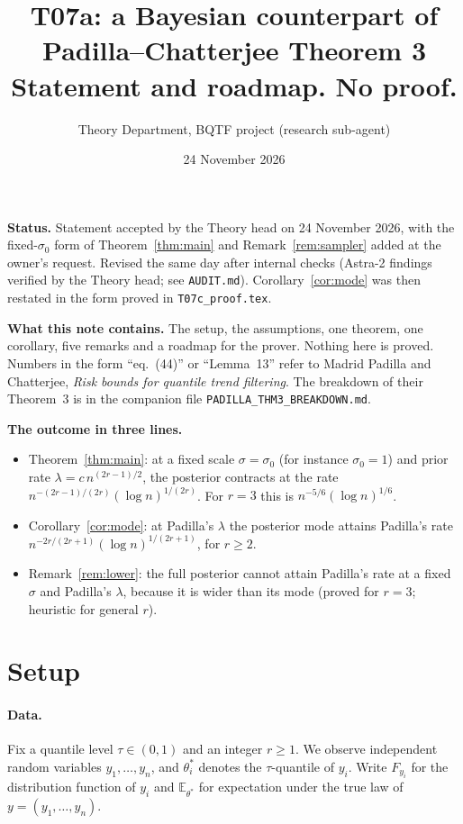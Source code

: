 \documentclass[11pt]{article}
\title{T07a: a Bayesian counterpart of Padilla--Chatterjee Theorem 3\\[2pt]
\large Statement and roadmap. No proof.}
\author{Theory Department, BQTF project (research sub-agent)}
\date{24 November 2026}
\theoremstyle{definition}
\theoremstyle{remark}
\newcommand{\E}{\mathbb{E}}
\newcommand{\thetas}{\theta^{*}}
\begin{document}
\maketitle

\noindent\textbf{Status.} Statement accepted by the Theory head on 24 November 2026, with the fixed-$\sigma_0$ form of Theorem~\ref{thm:main} and Remark~\ref{rem:sampler} added at the owner's request. Revised the same day after internal checks (Astra-2 findings verified by the Theory head; see \texttt{AUDIT.md}). Corollary~\ref{cor:mode} was then restated in the form proved in \texttt{T07c\_proof.tex}.\par\smallskip
\noindent\textbf{What this note contains.} The setup, the assumptions, one theorem, one corollary, five remarks and a roadmap for the prover. Nothing here is proved. Numbers in the form ``eq.~(44)'' or ``Lemma~13'' refer to Madrid Padilla and Chatterjee, \emph{Risk bounds for quantile trend filtering}. The breakdown of their Theorem~3 is in the companion file \texttt{PADILLA\_THM3\_BREAKDOWN.md}.

\medskip
\noindent\textbf{The outcome in three lines.}
\begin{itemize}[itemsep=1pt,topsep=2pt]
\item Theorem~\ref{thm:main}: at a fixed scale $\sigma=\sigma_0$ (for instance $\sigma_0=1$) and prior rate $\lambda=c\,n^{(2r-1)/2}$, the posterior contracts at the rate $n^{-(2r-1)/(2r)}(\log n)^{1/(2r)}$. For $r=3$ this is $n^{-5/6}(\log n)^{1/6}$.
\item Corollary~\ref{cor:mode}: at Padilla's $\lambda$ the posterior mode attains Padilla's rate $n^{-2r/(2r+1)}(\log n)^{1/(2r+1)}$, for $r\ge2$.
\item Remark~\ref{rem:lower}: the full posterior cannot attain Padilla's rate at a fixed $\sigma$ and Padilla's $\lambda$, because it is wider than its mode (proved for $r=3$; heuristic for general $r$).
\end{itemize}

\section{Setup}

\paragraph{Data.} Fix a quantile level $\tau\in(0,1)$ and an integer $r\ge 1$. We observe independent random variables $y_1,\dots,y_n$, and $\thetas_i$ denotes the $\tau$-quantile of $y_i$. Write $F_{y_i}$ for the distribution function of $y_i$ and $\E_{\thetas}$ for expectation under the true law of $y=(y_1,\dots,y_n)$.
\end{document}
